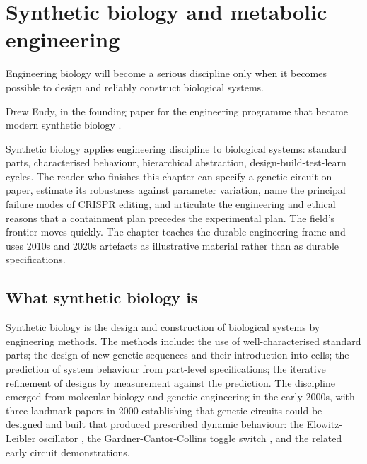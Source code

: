 \chapter{Synthetic biology and metabolic engineering}
\label{vol06:ch09}

\epigraph{Engineering biology will become a serious discipline only
when it becomes possible to design and reliably construct
biological systems.}{Drew Endy, in the founding paper for the
engineering programme that became modern synthetic biology
\cite[p.~449]{paper:v6c09-endy-foundations-2005}.}


\noindent
Synthetic biology applies engineering discipline to biological
systems: standard parts, characterised behaviour, hierarchical
abstraction, design-build-test-learn cycles. The reader who finishes
this chapter can specify a genetic circuit on paper, estimate its
robustness against parameter variation, name the principal failure
modes of CRISPR editing, and articulate the engineering and
ethical reasons that a containment plan precedes the experimental
plan. The field's frontier moves quickly. The chapter teaches the
durable engineering frame and uses 2010s and 2020s artefacts as
illustrative material rather than as durable specifications.

\section{What synthetic biology is}

Synthetic biology is the design and construction of biological
systems by engineering methods. The methods include: the use of
well-characterised standard parts; the design of new genetic
sequences and their introduction into cells; the prediction of
system behaviour from part-level specifications; the iterative
refinement of designs by measurement against the prediction. The
discipline emerged from molecular biology and genetic engineering in
the early 2000s, with three landmark papers in 2000 establishing
that genetic circuits could be designed and built that produced
prescribed dynamic behaviour: the Elowitz-Leibler oscillator
\cite[pp.~335--338]{paper:v6c09-elowitz-leibler-2000}, the Gardner-Cantor-Collins toggle switch \cite[pp.~339--342]{paper:v6c09-gardner-toggle-2000},
and the related early circuit demonstrations.

